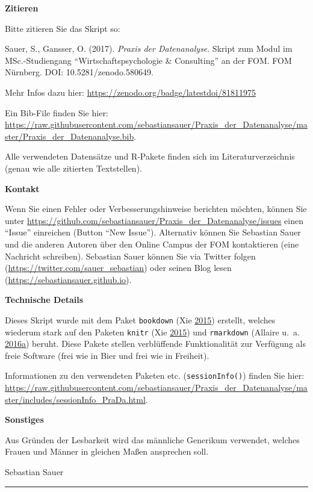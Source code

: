 \documentclass[12pt,ngerman,]{book}
\begin{document}
\textbf{Zitieren}

Bitte zitieren Sie das Skript so:

Sauer, S., Gansser, O. (2017). \emph{Praxis der Datenanalyse}. Skript
zum Modul im MSc.-Studiengang ``Wirtschaftspsychologie \& Consulting''
an der FOM. FOM Nürnberg. DOI: 10.5281/zenodo.580649.

Mehr Infos dazu hier: \url{https://zenodo.org/badge/latestdoi/81811975}

Ein Bib-File finden Sie hier:
\url{https://raw.githubusercontent.com/sebastiansauer/Praxis_der_Datenanalyse/master/Praxis_der_Datenanalyse.bib}.

Alle verwendeten Datensätze und R-Pakete finden sich im
Literaturverzeichnis (genau wie alle zitierten Textstellen).

\textbf{Kontakt}

Wenn Sie einen Fehler oder Verbesserungshinweise berichten möchten,
können Sie unter
\url{https://github.com/sebastiansauer/Praxis_der_Datenanalyse/issues}
einen ``Issue'' einreichen (Button ``New Issue''). Alternativ können Sie
Sebastian Sauer und die anderen Autoren über den Online Campus der FOM
kontaktieren (eine Nachricht schreiben). Sebastian Sauer können Sie via
Twitter folgen (\url{https://twitter.com/sauer_sebastian}) oder seinen
Blog lesen (\url{https://sebastiansauer.github.io}).

\textbf{Technische Details}

Dieses Skript wurde mit dem Paket \texttt{bookdown} (Xie
\protect\hyperlink{ref-xie2015}{2015}) erstellt, welches wiederum stark
auf den Paketen \texttt{knitr} (Xie
\protect\hyperlink{ref-xie2015}{2015}) und \texttt{rmarkdown} (Allaire
u.~a.
\protect\hyperlink{ref-rmarkdown}{2016}\protect\hyperlink{ref-rmarkdown}{a})
beruht. Diese Pakete stellen verblüffende Funktionalität zur Verfügung
als freie Software (frei wie in Bier und frei wie in Freiheit).

Informationen zu den verwendeten Paketen etc. (\texttt{sessionInfo()})
finden Sie hier:
\url{https://raw.githubusercontent.com/sebastiansauer/Praxis_der_Datenanalyse/master/includes/sessionInfo_PraDa.html}.

\textbf{Sonstiges}

Aus Gründen der Lesbarkeit wird das männliche Generikum verwendet,
welches Frauen und Männer in gleichen Maßen ansprechen soll.

Sebastian Sauer

\begin{center}\rule{0.5\linewidth}{\linethickness}\end{center}
\end{document}
